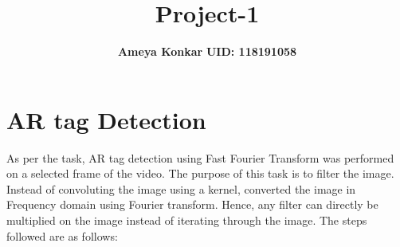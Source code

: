 \documentclass[11pt]{article}
\title{\textbf{Project-1}}
\author{\textbf{Ameya Konkar} \; \textbf{UID: 118191058}}
\begin{document}
\maketitle
\thispagestyle{empty}

\section{AR tag Detection }
As per the task, AR tag detection using Fast Fourier Transform was performed on a selected frame of the video. The purpose of this task is to filter the image. Instead of convoluting the image using a kernel, converted the image in Frequency domain using Fourier transform. Hence, any filter can directly be multiplied on the image instead of iterating through the image. The steps followed are as follows:\\
\end{document}
